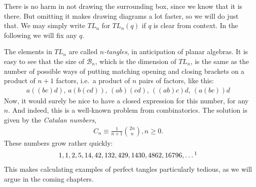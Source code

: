 There is no harm in not drawing the surrounding box, since we know that it is there. But omitting it makes drawing diagrams a lot faster, so we will do just that. We may simply write $TL_n$ for $TL_n(q)$ if $q$ is clear from context. In the following we will fix any $q$.

\bigno The elements in $TL_n$ are called \emph{$n$-tangles}, in anticipation of planar algebras. It is easy to see that the size of $\mathcal{B}_n$, which is the dimension of $TL_n$, is the same as the number of possible ways of putting matching opening and closing brackets on a product of $n+1$ factors, i.e.\ a product of $n$ pairs of factors, like this:
\begin{align*}
a((bc)d), \, a(b(cd)),\, (ab)(cd),\, ((ab)c)d,\, (a(bc))d
\end{align*}
Now, it would surely be nice to have a closed expression for this number, for any $n$. And indeed, this is a well-known problem from combinatorics. The solution is given by the \emph{Catalan numbers},
\begin{align*}
C_n \equiv\frac{1}{n+1} \binom{2n}{n}, n\geq 0.
\end{align*}
These numbers grow rather quickly:
\begin{align*}
	1, 1, 2, 5, 14, 42, 132, 429, 1430, 4862, 16796,\ldots\footnotemark
\end{align*}
This makes calculating examples of perfect tangles particularly tedious, as we will argue in the coming chapters.


